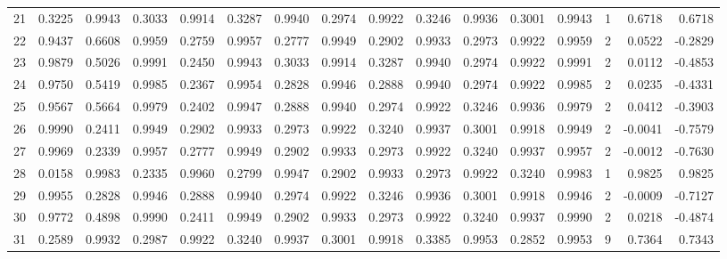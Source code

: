 \begin{tabular}{lrrrrrrrrrrrrrrr}
21  &      0.3225 &  0.9943 &  0.3033 &  0.9914 &  0.3287 &  0.9940 &  0.2974 &  0.9922 &  0.3246 &  0.9936 &   0.3001 &     0.9943 &      1 &                    0.6718 &                     0.6718 \\
22  &      0.9437 &  0.6608 &  0.9959 &  0.2759 &  0.9957 &  0.2777 &  0.9949 &  0.2902 &  0.9933 &  0.2973 &   0.9922 &     0.9959 &      2 &                    0.0522 &                    -0.2829 \\
23  &      0.9879 &  0.5026 &  0.9991 &  0.2450 &  0.9943 &  0.3033 &  0.9914 &  0.3287 &  0.9940 &  0.2974 &   0.9922 &     0.9991 &      2 &                    0.0112 &                    -0.4853 \\
24  &      0.9750 &  0.5419 &  0.9985 &  0.2367 &  0.9954 &  0.2828 &  0.9946 &  0.2888 &  0.9940 &  0.2974 &   0.9922 &     0.9985 &      2 &                    0.0235 &                    -0.4331 \\
25  &      0.9567 &  0.5664 &  0.9979 &  0.2402 &  0.9947 &  0.2888 &  0.9940 &  0.2974 &  0.9922 &  0.3246 &   0.9936 &     0.9979 &      2 &                    0.0412 &                    -0.3903 \\
26  &      0.9990 &  0.2411 &  0.9949 &  0.2902 &  0.9933 &  0.2973 &  0.9922 &  0.3240 &  0.9937 &  0.3001 &   0.9918 &     0.9949 &      2 &                   -0.0041 &                    -0.7579 \\
27  &      0.9969 &  0.2339 &  0.9957 &  0.2777 &  0.9949 &  0.2902 &  0.9933 &  0.2973 &  0.9922 &  0.3240 &   0.9937 &     0.9957 &      2 &                   -0.0012 &                    -0.7630 \\
28  &      0.0158 &  0.9983 &  0.2335 &  0.9960 &  0.2799 &  0.9947 &  0.2902 &  0.9933 &  0.2973 &  0.9922 &   0.3240 &     0.9983 &      1 &                    0.9825 &                     0.9825 \\
29  &      0.9955 &  0.2828 &  0.9946 &  0.2888 &  0.9940 &  0.2974 &  0.9922 &  0.3246 &  0.9936 &  0.3001 &   0.9918 &     0.9946 &      2 &                   -0.0009 &                    -0.7127 \\
30  &      0.9772 &  0.4898 &  0.9990 &  0.2411 &  0.9949 &  0.2902 &  0.9933 &  0.2973 &  0.9922 &  0.3240 &   0.9937 &     0.9990 &      2 &                    0.0218 &                    -0.4874 \\
31  &      0.2589 &  0.9932 &  0.2987 &  0.9922 &  0.3240 &  0.9937 &  0.3001 &  0.9918 &  0.3385 &  0.9953 &   0.2852 &     0.9953 &      9 &                    0.7364 &                     0.7343 \\

\end{tabular}
